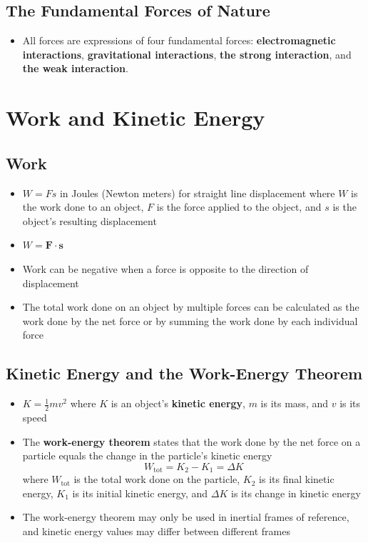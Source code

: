 \documentclass{article}
\begin{document}
\setcounter{subsection}{4}
\subsection{The Fundamental Forces of Nature}

\begin{itemize}
    \item All forces are expressions of four fundamental forces: \textbf{electromagnetic interactions}, \textbf{gravitational interactions}, \textbf{the strong interaction}, and \textbf{the weak interaction}.
\end{itemize}

\section{Work and Kinetic Energy}

\subsection{Work}

\begin{itemize}
    \item $W=Fs$ in Joules (Newton meters) for straight line displacement where $W$ is the work done to an object, $F$ is the force applied to the object, and $s$ is the object's resulting displacement

    \item $W=\mathbf{F}\cdot\mathbf{s}$

    \item Work can be negative when a force is opposite to the direction of displacement

    \item The total work done on an object by multiple forces can be calculated as the work done by the net force or by summing the work done by each individual force
\end{itemize}

\subsection{Kinetic Energy and the Work-Energy Theorem}

\begin{itemize}
    \item $K=\frac{1}{2}mv^2$ where $K$ is an object's \textbf{kinetic energy}, $m$ is its mass, and $v$ is its speed

    \item The \textbf{work-energy theorem} states that the work done by the net force on a particle equals the change in the particle's kinetic energy \[W_\textrm{tot}=K_2-K_1=\Delta K\] where $W_\textrm{tot}$ is the total work done on the particle, $K_2$ is its final kinetic energy, $K_1$ is its initial kinetic energy, and $\Delta K$ is its change in kinetic energy

    \item The work-energy theorem may only be used in inertial frames of reference, and kinetic energy values may differ between different frames
\end{itemize}
\end{document}
